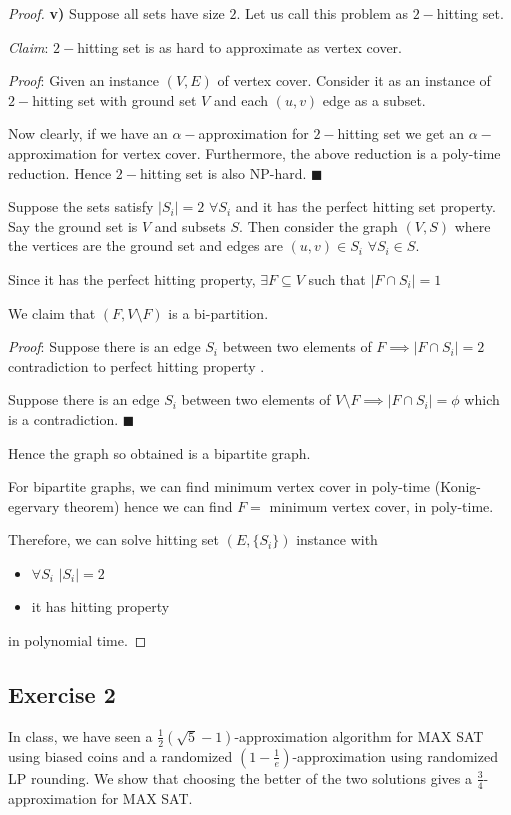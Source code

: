 \documentclass[12pt]{article}
\newcommand*{\QEDA}{\hfill\ensuremath{\blacksquare}}%
\begin{document}
\begin{proof}
\textbf{v)} Suppose all sets have size $2$. Let us call this problem as $2-$hitting set.

\textsl{Claim}: $2-$hitting set is as hard to approximate as vertex cover.

\textsl{Proof}: Given an instance $(V,E)$ of vertex cover. Consider it as an instance of $2-$hitting set with ground set $V$ and each $(u,v)$ edge as a subset.

Now clearly, if we have an $\alpha-$approximation for $2-$hitting set we get an $\alpha-$approximation for vertex cover. Furthermore, the above reduction is a poly-time reduction. Hence $2-$hitting set is also NP-hard. \QEDA

Suppose the sets satisfy $|S_i|=2$ $\forall S_i$ and it has the perfect hitting set property. Say the ground set is $V$ and subsets $S$. Then consider the graph $(V,S)$ where the vertices are the ground set and edges are $(u,v) \in S_i$ $\forall S_i \in S$.

Since it has the perfect hitting property, $\exists F \subseteq V$ such that $|F \cap S_i| = 1$

We claim that $(F, V \setminus F)$ is a bi-partition. 

\textsl{Proof}: Suppose there is an edge $S_i$ between two elements of $F \implies |F \cap S_i| = 2$ contradiction to perfect hitting property .

Suppose there is an edge $S_i$ between two elements of $V \setminus F \implies |F \cap S_i| = \phi$ which is a contradiction. \QEDA

Hence the graph so obtained is a bipartite graph.

For bipartite graphs, we can find minimum vertex cover in poly-time (Konig-egervary theorem) hence we can find $F =$ minimum vertex cover, in poly-time.

Therefore, we can solve hitting set $(E, \{S_i\})$ instance with 
\begin{itemize}
    \item $\forall S_i$ $|S_i| = 2$
    \item it has hitting property
\end{itemize}
in polynomial time.

\end{proof}

\subsection*{Exercise 2}
In class, we have seen a $\frac{1}{2}(\sqrt{5}-1)$-approximation algorithm for MAX SAT using biased coins and a randomized $(1-\frac{1}{e})$-approximation using randomized LP rounding. We show that choosing the better of the two solutions gives a $\frac{3}{4}$-approximation for MAX SAT.
\end{document}
